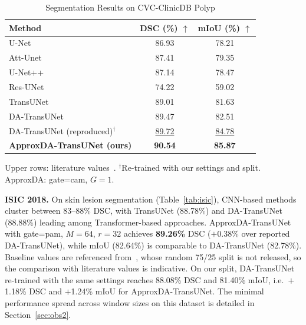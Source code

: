 \begin{table}[ht]
  \caption{Segmentation Results on CVC-ClinicDB Polyp}
  \label{tab:cvc}
  \centering
  \renewcommand{\arraystretch}{1.15}
  \setlength{\tabcolsep}{6pt}
  \begin{tabular}{lcc}
    \toprule
    Method & DSC (\%) $\uparrow$ & mIoU (\%) $\uparrow$ \\
    \midrule
    U-Net~\cite{ronneberger2015unet}           & 86.93 & 78.21 \\
    Att-Unet~\cite{oktay2018attention}         & 87.41 & 79.35 \\
    U-Net++~\cite{zhou2018unetpp}              & 87.14 & 78.47 \\
    Res-UNet~\cite{diakogiannis2020resunet}    & 74.22 & 59.02 \\
    TransUNet~\cite{chen2021transunet}         & 89.01 & 81.63 \\
    DA-TransUNet~\cite{sun2024datransunet}     & 89.47 & 82.51 \\
    \midrule
    DA-TransUNet (reproduced)$^\dag$           & \underline{89.72} & \underline{84.78} \\
    \textbf{ApproxDA-TransUNet (ours)}         & \textbf{90.54} & \textbf{85.87} \\
    \bottomrule
  \end{tabular}\par\vspace{3pt}
  \begin{minipage}{\linewidth}\footnotesize Upper rows: literature values~\cite{sun2024datransunet}. $^\dag$Re-trained with our settings and split. ApproxDA: gate=cam, $G{=}1$.\end{minipage}
\end{table}

\textbf{ISIC 2018.} On skin lesion segmentation (Table~\ref{tab:isic}), CNN-based methods cluster between 83--88\% DSC, with TransUNet (88.78\%) and DA-TransUNet (88.88\%) leading among Transformer-based approaches. ApproxDA-TransUNet with gate=pam, $M{=}64$, $r{=}32$ achieves \textbf{89.26\%} DSC ($+$0.38\% over reported DA-TransUNet), while mIoU (82.64\%) is comparable to DA-TransUNet (82.78\%). Baseline values are referenced from~\cite{sun2024datransunet}, whose random 75/25 split is not released, so the comparison with literature values is indicative. On our split, DA-TransUNet re-trained with the same settings reaches 88.08\% DSC and 81.40\% mIoU, i.e.\ $+$1.18\% DSC and $+$1.24\% mIoU for ApproxDA-TransUNet. The minimal performance spread across window sizes on this dataset is detailed in Section~\ref{sec:obs2}.

